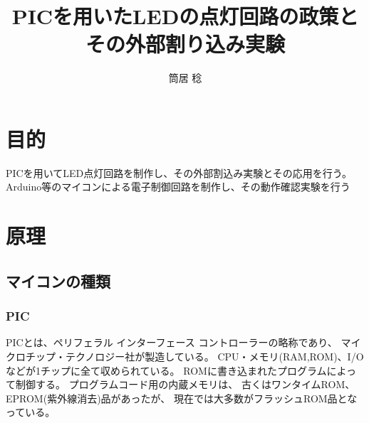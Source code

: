 \documentclass{jsarticle}
\begin{document}


\title{PICを用いたLEDの点灯回路の政策とその外部割り込み実験}
\author{筒居 稔}
\maketitle


\section{目的}
PICを用いてLED点灯回路を制作し、その外部割込み実験とその応用を行う。
Arduino等のマイコンによる電子制御回路を制作し、その動作確認実験を行う

\section{原理}
\subsection{マイコンの種類}
\subsubsection{PIC}
PICとは、ペリフェラル インターフェース コントローラーの略称であり、
マイクロチップ・テクノロジー社が製造している。
CPU・メモリ(RAM,ROM)、I/Oなどが1チップに全て収められている。
ROMに書き込まれたプログラムによって制御する。
プログラムコード用の内蔵メモリは、
古くはワンタイムROM、EPROM(紫外線消去)品があったが、
現在では大多数がフラッシュROM品となっている。
\end{document}
